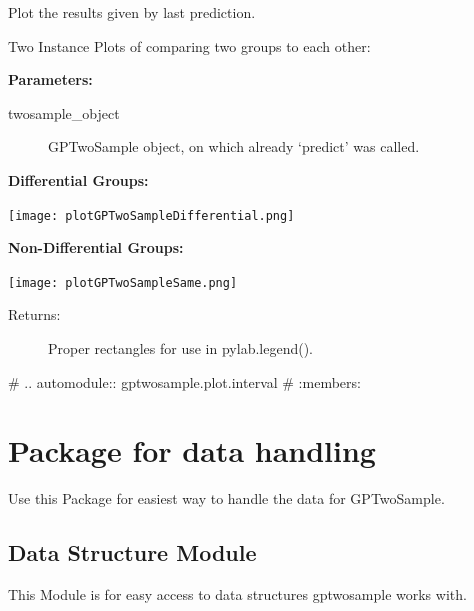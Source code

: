 \documentclass[letterpaper,10pt,english]{sphinxmanual}
\begin{document}
\begin{fulllineitems}
\label{plot:gptwosample.plot.plot_basic.plot_results}
Plot the results given by last prediction.

Two Instance Plots of comparing two groups to each other:

\textbf{Parameters:}
\begin{description}
\item[{twosample\_object}] \leavevmode{[}\code{gptwosample.twosample}{]}
GPTwoSample object, on which already `predict' was called.

\end{description}

\textbf{Differential Groups:}

\texttt{[image: plotGPTwoSampleDifferential.png]}

\textbf{Non-Differential Groups:}

\texttt{[image: plotGPTwoSampleSame.png]}
\begin{description}
\item[{Returns:}] \leavevmode
Proper rectangles for use in pylab.legend().

\end{description}

\end{fulllineitems}


\#  .. automodule:: gptwosample.plot.interval
\#    :members:
\label{data:module-gptwosample.data}

\section{Package for data handling}
\label{data:package-for-data-handling}\label{data::doc}
Use this Package for easiest way to handle the data for GPTwoSample.
\label{data:module-gptwosample.data.data_base}

\subsection{Data Structure Module}
\label{data:data-structure-module}
This Module is for easy access to data structures gptwosample works with.
\end{document}
